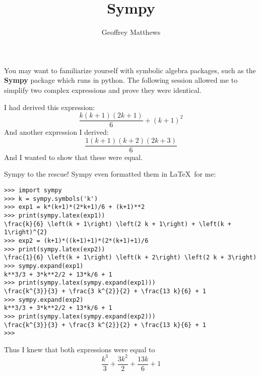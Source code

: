 \documentclass{article}
\title{Sympy}
\author{Geoffrey Matthews}
\begin{document}
\maketitle


  You may want to familiarize yourself with symbolic algebra packages,
  such as the {\bf Sympy} package which runs in python.  The following
  session allowed me to simplify two complex expressions
  and prove they were identical.

  I had derived this expression:
  \[
  \frac{k \left(k + 1\right) \left(2 k + 1\right)}{6} + \left(k + 1\right)^{2}
  \]
  And another expression I derived:
  \[
\frac{1 \left(k + 1\right) \left(k + 2\right) \left(2 k + 3\right)}{6}
\]
And I wanted to show that these were equal.

Sympy to the rescue!  
  Sympy even formatted them in \LaTeX\ for me:
  \begin{Verbatim}[frame=single]
>>> import sympy
>>> k = sympy.symbols('k')
>>> exp1 = k*(k+1)*(2*k+1)/6 + (k+1)**2
>>> print(sympy.latex(exp1))
\frac{k}{6} \left(k + 1\right) \left(2 k + 1\right) + \left(k + 1\right)^{2}
>>> exp2 = (k+1)*((k+1)+1)*(2*(k+1)+1)/6
>>> print(sympy.latex(exp2))
\frac{1}{6} \left(k + 1\right) \left(k + 2\right) \left(2 k + 3\right)
>>> sympy.expand(exp1)
k**3/3 + 3*k**2/2 + 13*k/6 + 1
>>> print(sympy.latex(sympy.expand(exp1)))
\frac{k^{3}}{3} + \frac{3 k^{2}}{2} + \frac{13 k}{6} + 1
>>> sympy.expand(exp2)
k**3/3 + 3*k**2/2 + 13*k/6 + 1
>>> print(sympy.latex(sympy.expand(exp2)))
\frac{k^{3}}{3} + \frac{3 k^{2}}{2} + \frac{13 k}{6} + 1
>>> 
 \end{Verbatim}
  Thus I knew that both expressions were equal to
  \[
  \frac{k^{3}}{3} + \frac{3 k^{2}}{2} + \frac{13 k}{6} + 1
  \]
\end{document}

